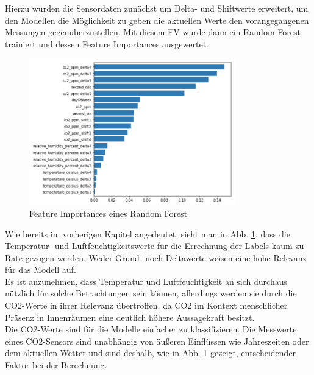 \newpage
Hierzu wurden die Sensordaten zunächst um Delta- und Shiftwerte erweitert, um den Modellen die Möglichkeit zu geben
die aktuellen Werte den vorangegangenen Messungen gegenüberzustellen. Mit diesem FV wurde dann ein Random Forest
trainiert und dessen Feature Importances ausgewertet.

\begin{figure}[h]
    \centering
    \includegraphics[width=0.8\textwidth]{pic/feature_importances.png}
    \caption{Feature Importances eines Random Forest}
    \label{fig:FI}
\end{figure}

Wie bereits im vorherigen Kapitel angedeutet, sieht man in Abb. \ref{fig:FI}, dass die Temperatur- und 
Luftfeuchtigkeitswerte für die Errechnung der Labels kaum zu Rate gezogen werden. 
Weder Grund- noch Deltawerte weisen eine hohe Relevanz für das Modell auf.\\
Es ist anzunehmen, dass Temperatur und Luftfeuchtigkeit an sich durchaus nützlich für solche Betrachtungen sein
können, allerdings werden sie durch die CO2-Werte in ihrer Relevanz übertroffen, da CO2 im Kontext menschlicher
Präsenz in Innenräumen eine deutlich höhere Aussagekraft besitzt.\\
Die CO2-Werte sind für die Modelle einfacher zu klassifizieren. Die Messwerte
eines CO2-Sensors sind unabhängig von äußeren Einflüssen wie Jahreszeiten oder dem aktuellen Wetter 
und sind deshalb, wie in Abb. \ref{fig:FI} gezeigt, entscheidender Faktor bei der Berechnung.

